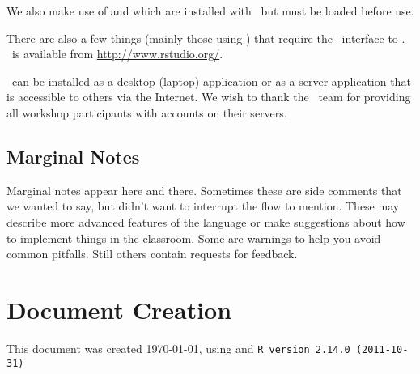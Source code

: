 We also make use of  and  which are installed with 
\R\ but must be loaded before use.

There are also a few things (mainly those using ) that require
the \RStudio\ interface to \R.  \RStudio\ is available from 
\url{http://www.rstudio.org/}.

\RStudio\ can be installed as a desktop (laptop) application or as a server application
that is accessible to others via the Internet.
We wish to thank the \RStudio\ team for providing all workshop participants with
accounts on their servers.

%

\newpage    %

\subsection*{Marginal Notes}
Marginal notes appear here and there.  
%
Sometimes these are side comments that we 
wanted to say, but didn't want to interrupt the flow to mention.  
%
These may describe more advanced features of the language or make suggestions
about how to implement things in the classroom.  Some are warnings
to help you avoid common pitfalls.  Still others contain requests for feedback.


\section*{Document Creation}
This document was created 
\today, using  and 
\texttt{R version 2.14.0 (2011-10-31)} 


